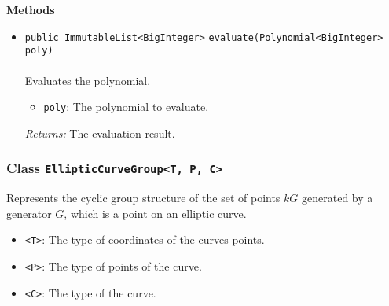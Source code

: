 \textbf{\sffamily Methods}
\begin{itemize}
\item \lstinline|public ImmutableList<BigInteger>| \lstinline|evaluate|\lstinline|(Polynomial<BigInteger> poly)|\\ \\[-0.6em]
Evaluates the polynomial.
\begin{itemize}
\item \lstinline|poly|: The polynomial to evaluate.
\end{itemize}

\emph{Returns:} The evaluation result.

\end{itemize}

\subsubsection{Class \lstinline|EllipticCurveGroup<T, P, C>|}
Represents the cyclic group structure of the set of points $kG$ generated
 by a generator $G$, which is a point on an elliptic curve. \\
\noindent\begin{minipage}[t]{5cm}
\vspace{0.3em}
\hspace*{2em}
\vspace{0.3em}
\end{minipage}

\begin{itemize}
\item \lstinline|<T>|: The type of coordinates of the curves points.
\item \lstinline|<P>|: The type of points of the curve.
\item \lstinline|<C>|: The type of the curve.
\end{itemize}


